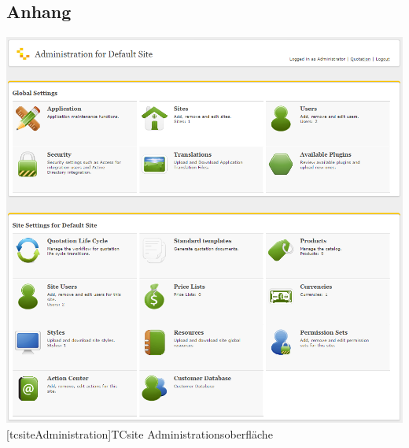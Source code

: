 \setcounter{page}{1}

\begin{appendix}
\section*{Anhang}
{}

\vspace{1em}
\begin{minipage}{\linewidth}
	\centering
	\includegraphics[width=1\linewidth]{Abbildungen/tcsiteAdministration.PNG}
	[tcsiteAdministration]{TCsite Administrationsoberfläche}
	\label{app:tcsiteAdministration}
\end{minipage}
\vspace{1em}


\end{appendix}
